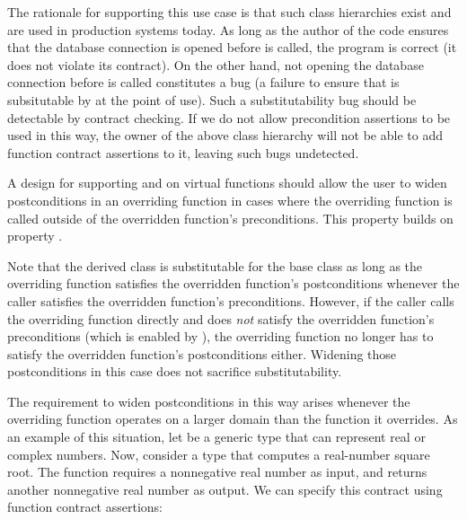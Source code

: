 The rationale for supporting this use case is that such class hierarchies exist and are used in production systems today. As long as the author of the code ensures that the database connection is opened before \allowbreak{} is called, the program is correct (it does not violate its contract). On the other hand, not opening the database connection before \allowbreak{} is called constitutes a bug (a failure to ensure that  is subsitutable by  at the point of use). Such a substitutability bug  should be detectable by contract checking. If we do not allow precondition assertions to be used in this way, the owner of the above class hierarchy will not be able to add function contract assertions to it, leaving such bugs undetected.



A design for supporting  and  on virtual functions should allow the user to widen postconditions in an overriding function in cases where the overriding function is called outside of the overridden function's preconditions. This property builds on property .

Note that the derived class is substitutable for the base class as long as the overriding function satisfies the overridden function's postconditions whenever the caller satisfies the overridden function's preconditions. However, if the caller calls the overriding function directly and does \emph{not} satisfy the overridden function's preconditions (which is enabled by ), the overriding function no longer has to satisfy the overridden function's postconditions either. Widening those postconditions in this case does not sacrifice substitutability.

The requirement to widen postconditions in this way arises whenever the overriding function operates on a larger domain than the function it overrides. As an example of this situation, let  be a generic type that can represent real or complex numbers. Now, consider a type  that computes a real-number square root. The function  requires a nonnegative real number as input, and returns another nonnegative real number as output. We can specify this contract using function contract assertions:

